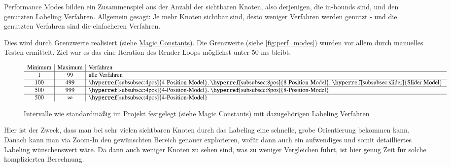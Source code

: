 
Performance Modes bilden ein Zusammenspiel aus der Anzahl der sichtbaren Knoten, also derjenigen, die in-bounds sind, und den
genutzten Labeling Verfahren. Allgemein gesagt: Je mehr Knoten sichtbar sind, desto weniger Verfahren werden genutzt -
und die genutzten Verfahren sind die einfacheren Verfahren.

Dies wird durch Grenzwerte realisiert (siehe \hyperref[subsec:consts]{Magic Constants}).
Die Grenzwerte (siehe \autoref{fig:perf_modes}) wurden vor allem durch manuelles Testen ermittelt.
Ziel war es das eine Iteration des Render-Loops möglichst unter $50$ ms bleibt.

\begin{figure}[H]
    \centering
    $$
    \begin{array}{c|c|l}
        \text{Minimum} & \text{Maximum} & \text{Verfahren}\\ \hline
        1 & 99 & \text{alle Verfahren}\\ \hline
        100 & 499 & \text{\hyperref[subsubsec:4pos]{4-Position-Model}, \hyperref[subsubsec:8pos]{8-Position-Model}, \hyperref[subsubsec:slider]{Slider-Model} }\\ \hline
        500 & 999 & \text{\hyperref[subsubsec:4pos]{4-Position-Model}, \hyperref[subsubsec:8pos]{8-Position-Model} }\\ \hline
        500 & \infty & \text{\hyperref[subsubsec:4pos]{4-Position-Model}}
    \end{array}
    $$
    \caption{Intervalle wie standardmäßig im Projekt festgelegt (siehe \hyperref[subsec:consts]{Magic Constants}) mit dazugehörigen Labeling Verfahren}
    \label{fig:perf_modes}
\end{figure}

Hier ist der Zweck, dass man bei sehr vielen sichtbaren Knoten durch das Labeling eine schnelle, grobe Orientierung bekommen kann.
Danach kann man via Zoom-In den gewünschten Bereich genauer explorieren, wofür dann auch ein aufwendiges und somit detailliertes Labeling wünschenswert wäre.
Da dann auch weniger Knoten zu sehen sind, was zu weniger Vergleichen führt, ist hier genug Zeit für solche komplizierten Berechnung.

